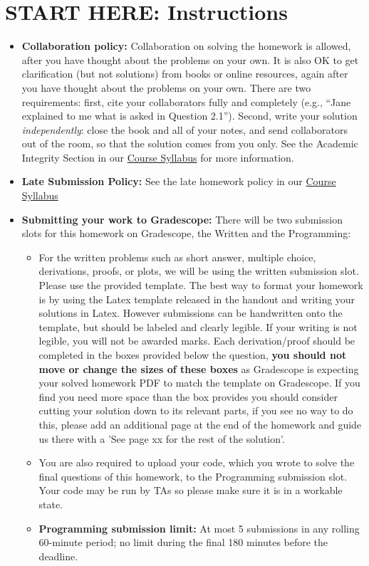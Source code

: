 \documentclass{article}
\begin{document}
\section*{START HERE: Instructions}
\begin{itemize}
\item \textbf{Collaboration policy:} Collaboration on solving the homework is allowed, after you have thought about the problems on your own. It is also OK to get clarification (but not solutions) from books or online resources, again after you have thought about the problems on your own. There are two requirements: first, cite your collaborators fully and completely (e.g., ``Jane explained to me what is asked in Question 2.1''). Second, write your solution {\em independently}: close the book and all of your notes, and send collaborators out of the room, so that the solution comes from you only. See the Academic Integrity Section in our \href{\currentsyllabus}{Course Syllabus} for more information.

\item\textbf{Late Submission Policy:} See the late homework policy in our \href{\currentsyllabus}{Course Syllabus}

\item\textbf{Submitting your work to Gradescope:} There will be two submission slots for this homework on Gradescope, the Written and the Programming:

\begin{itemize}

\item For the written problems such as short answer, multiple choice, derivations, proofs, or plots, we will be using the written submission slot. Please use the provided template. The best way to format your homework is by using the Latex template released in the handout and writing your solutions in Latex. However submissions can be handwritten onto the template, but should be labeled and clearly legible. If your writing is not legible, you will not be awarded marks.  Each derivation/proof should be  completed in the boxes provided below the question, \textbf{you should not move or change the sizes of these boxes} as Gradescope is expecting your solved homework PDF to match the template on Gradescope. If you find you need more space than the box provides you should consider cutting your solution down to its relevant parts, if you see no way to do this, please add an additional page at the end of the homework and guide us there with a 'See page xx for the rest of the solution'.
\item You are also required to upload your code, which you wrote to solve the final questions of this homework, to the Programming submission slot. Your code may be run by TAs so please make sure it is in a workable state. \item \textbf{Programming submission limit:} At most 5 submissions in any rolling 60-minute period; no limit during the final 180 minutes before the deadline.


\end{itemize}
\end{itemize}
\end{document}
